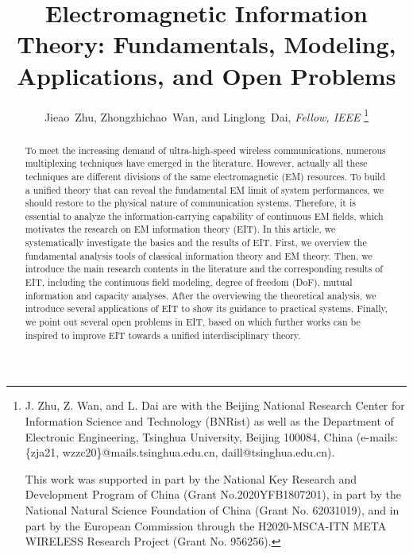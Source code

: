 \documentclass[journal,twocolumn]{IEEEtran}
\begin{document}
\title{Electromagnetic Information Theory: Fundamentals, Modeling, Applications, and Open Problems}

\author{{Jieao~Zhu, Zhongzhichao~Wan, and Linglong~Dai, {\textit{Fellow, IEEE}}}
\thanks{J. Zhu, Z. Wan, and L. Dai are with the Beijing National Research Center for Information Science and Technology (BNRist) as well as the Department of Electronic Engineering, Tsinghua University, Beijing 100084, China (e-mails: \{zja21, wzzc20\}@mails.tsinghua.edu.cn, daill@tsinghua.edu.cn).

This work was supported in part by the National Key Research and Development Program of China (Grant No.2020YFB1807201), in part by the National Natural Science Foundation of China (Grant No. 62031019), and in part by the European Commission through the H2020-MSCA-ITN META WIRELESS Research Project (Grant No. 956256).}
}

\maketitle

\begin{abstract}
   To meet the increasing demand of ultra-high-speed wireless communications, numerous multiplexing techniques have emerged in the literature. However, actually all these techniques are different divisions of the same electromagnetic (EM) resources. To build a unified theory that can reveal the fundamental EM limit of system performances, we should restore to the physical nature of communication systems. Therefore, it is essential to analyze the information-carrying capability of continuous EM fields, which motivates the research on EM information theory (EIT). In this article, we systematically investigate the basics and the results of EIT. First, we overview the fundamental analysis tools of classical information theory and EM theory. Then, we introduce the main research contents in the literature and the corresponding results of EIT, including the continuous field modeling, degree of freedom (DoF), mutual information and capacity analyses. After the overviewing the theoretical analysis, we introduce several applications of EIT to show its guidance to practical systems. Finally, we point out several open problems in EIT, based on which further works can be inspired to improve EIT towards a unified interdisciplinary theory.
\end{abstract}
\end{document}
